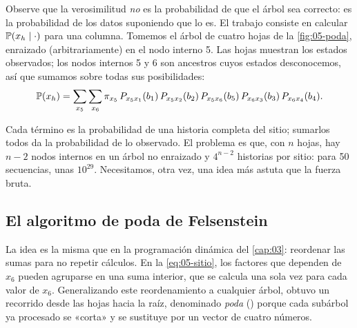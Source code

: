 \begin{simbolos}
\end{simbolos}

Observe que la verosimilitud \emph{no} es la probabilidad de que el árbol sea correcto: es la probabilidad de los datos suponiendo que lo es. El trabajo consiste en calcular $\mathbb{P}(x_h\mid\cdot)$ para una columna. Tomemos el árbol de cuatro hojas de la \cref{fig:05-poda}, enraizado (arbitrariamente) en el nodo interno 5. Las hojas muestran los estados observados; los nodos internos 5 y 6 son ancestros cuyos estados desconocemos, así que sumamos sobre todas sus posibilidades:
\begin{equation}\label{eq:05-sitio}
\mathbb{P}(x_h) = \sum_{x_5}\sum_{x_6}\pi_{x_5}\,P_{x_5x_1}(b_1)\,P_{x_5x_2}(b_2)\,P_{x_5x_6}(b_5)\,P_{x_6x_3}(b_3)\,P_{x_6x_4}(b_4).
\end{equation}

\begin{simbolos}
\end{simbolos}

Cada término es la probabilidad de una historia completa del sitio; sumarlos todos da la probabilidad de lo observado. El problema es que, con $n$ hojas, hay $n-2$ nodos internos en un árbol no enraizado y $4^{n-2}$ historias por sitio: para 50 secuencias, unas $10^{29}$. Necesitamos, otra vez, una idea más astuta que la fuerza bruta.

\subsection{El algoritmo de poda de Felsenstein}

La idea es la misma que en la programación dinámica del \cref{cap:03}: reordenar las sumas para no repetir cálculos. En la \cref{eq:05-sitio}, los factores que dependen de $x_6$ pueden agruparse en una suma interior, que se calcula una sola vez para cada valor de $x_6$. Generalizando este reordenamiento a cualquier árbol, \textcite{c05-felsenstein1981} obtuvo un recorrido desde las hojas hacia la raíz, denominado \emph{poda} () porque cada subárbol ya procesado se «corta» y se sustituye por un vector de cuatro números.

